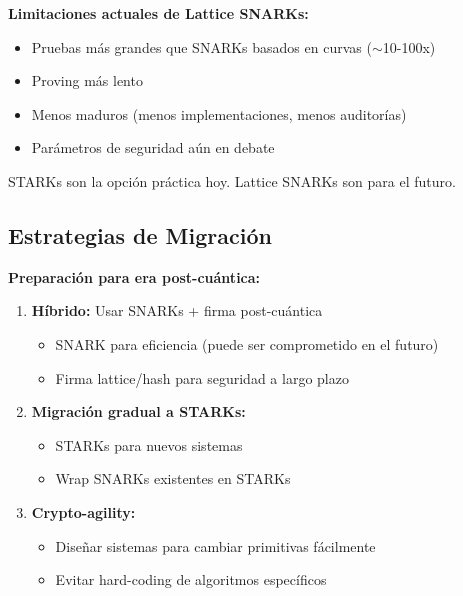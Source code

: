 \documentclass[11pt,a4paper,twoside]{book}
\begin{document}
\begin{remark}
\textbf{Limitaciones actuales de Lattice SNARKs:}
\begin{itemize}
    \item Pruebas m\'as grandes que SNARKs basados en curvas ($\sim$10-100x)
    \item Proving m\'as lento
    \item Menos maduros (menos implementaciones, menos auditor\'ias)
    \item Par\'ametros de seguridad a\'un en debate
\end{itemize}

STARKs son la opci\'on pr\'actica hoy. Lattice SNARKs son para el futuro.
\end{remark}

\subsection{Estrategias de Migraci\'on}

\begin{keyidea}
\textbf{Preparaci\'on para era post-cu\'antica:}

\begin{enumerate}
    \item \textbf{H\'ibrido:} Usar SNARKs + firma post-cu\'antica
    \begin{itemize}
        \item SNARK para eficiencia (puede ser comprometido en el futuro)
        \item Firma lattice/hash para seguridad a largo plazo
    \end{itemize}
    
    \item \textbf{Migraci\'on gradual a STARKs:}
    \begin{itemize}
        \item STARKs para nuevos sistemas
        \item Wrap SNARKs existentes en STARKs
    \end{itemize}
    
    \item \textbf{Crypto-agility:}
    \begin{itemize}
        \item Dise\~nar sistemas para cambiar primitivas f\'acilmente
        \item Evitar hard-coding de algoritmos espec\'ificos
    \end{itemize}
\end{enumerate}
\end{keyidea}
\end{document}
